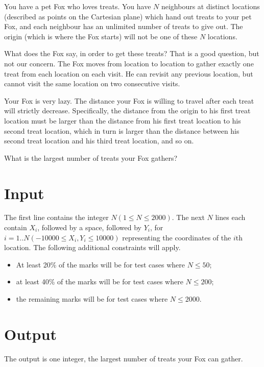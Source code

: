 
You have a pet Fox who loves treats. You have $N$ neighbours at distinct locations (described as points on the Cartesian plane) which hand out treats to your pet Fox, and each neighbour has an unlimited number of treats to give out. The origin (which is where the Fox starts) will not be one of these $N$ locations.
 
What does the Fox say, in order to get these treats? That is a good question, but not our concern. The Fox moves from location to location to gather exactly one treat from each location on each visit. He can revisit any previous location, but cannot visit the same location on two consecutive visits.
 
Your Fox is very lazy. The distance your Fox is willing to travel after each treat will strictly decrease. Specifically, the distance from the origin to his first treat location must be larger than the distance from his first treat location to his second treat location, which in turn is larger than the distance between his second treat location and his third treat location, and so on.
 
What is the largest number of treats your Fox gathers?

\section*{Input}
The first line contains the integer $N (1 \leq N \leq 2000)$. The next $N$ lines each contain $X_i$, followed
by a space, followed by $Y_i$, for $i = 1..N (-10000 \leq X_i,Y_i \leq 10000)$ representing the coordinates
of the $i$th location. The following additional constraints will apply.

\begin{itemize}
\item At least 20\% of the marks will be for test cases where $N \leq 50$;
\item at least 40\% of the marks will be for test cases where $N \leq 200$;
\item the remaining marks will be for test cases where $N \leq 2000$.
\end{itemize}


\section*{Output}
The output is one integer, the largest number of treats your Fox can gather.